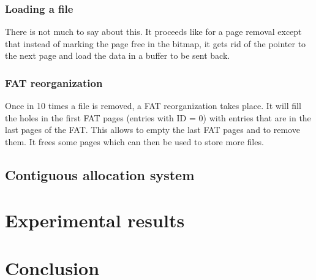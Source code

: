 \documentclass[10pt,a4paper]{ULBreport}
\begin{document}
\subsection{Loading a file}
There is not much to say about this. It proceeds like for a page removal except that instead of marking the page free in the bitmap, it gets rid of the pointer to the next page and load the data in a buffer to be sent back.
\subsection{FAT reorganization}
Once in 10 times a file is removed, a FAT reorganization takes place. It will fill the holes in the first FAT pages (entries with ID = 0) with entries that are in the last pages of the FAT. This allows to empty the last FAT pages and to remove them. It frees some pages which can then be used to store more files.

\section{Contiguous allocation system}









\chapter{Experimental results}







\chapter{Conclusion}



\end{document}
